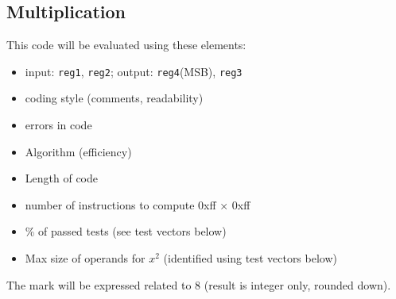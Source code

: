 \documentclass[10pt,a4paper]{article}
\theoremstyle{definition}%
\begin{document}
\subsection{Multiplication}
%
This code will be evaluated using these elements: 
\begin{itemize}
\item input: \verb!reg1!, \verb!reg2!; output: \verb!reg4!(MSB), \verb!reg3!
\item coding style (comments, readability)
\item errors in code
\item Algorithm (efficiency) 
\item Length of code %
\item number of instructions to compute 0xff × 0xff %
\item \% of passed tests (see test vectors below)
\item Max size of operands for $x^2$ (identified using test vectors below)
\end{itemize}
The mark will be expressed related to 8  (result is integer only, rounded down).
\end{document}
